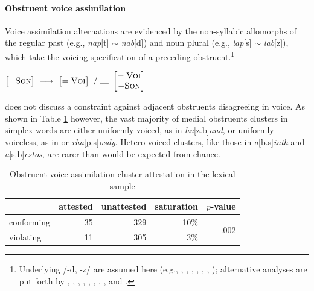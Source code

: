 \paragraph{Obstruent voice assimilation}
\label{ova}

Voice assimilation alternations are evidenced by the non-syllabic allomorphs of the regular past (e.g., \emph{nap}[t] $\sim$ \emph{nab}[d]) and noun plural (e.g., \emph{lap}[s] $\sim$ \emph{lab}[z]), which take the voicing specification of a preceding obstruent.\footnote{Underlying /-d, -z/ are assumed here (e.g., \citealt{Anderson1973a}, \citealt[284f.]{Bakovic2005b}, \citealt{Basboll1972}, \citealt[210]{SPE}, \citealt[282]{Hockett1958}, \citealt[102]{Pinker1988}, \citealt{Shibatani1972}); alternative analyses are put forth by \citet[210f.]{LANGUAGE}, \citet[135]{Borowsky1986}, \citet{Hoard1971}, \citet{Kiparsky1985}, \citet{Lightner1970}, \citet{Luelsdorff1969}, \citet{Miner1975}, \citet[426]{Nida1948}, and \citet{Zwicky1975}.}

\begin{example}
\label{ovarule}
$\begin{bmatrix} -\textsc{Son} \end{bmatrix}~\goesto~\begin{bmatrix} =\textsc{Voi} \end{bmatrix}~/~\gap~\begin{bmatrix} =\textsc{Voi} \\ -\textsc{Son} \end{bmatrix}$
\end{example}

\noindent
\citet{Pierrehumbert1994} does not discuss a constraint against adjacent obstruents disagreeing in voice. 
As shown in Table \ref{ovatab} however, the vast majority of medial obstruents clusters in simplex words are either uniformly voiced, as in \emph{hu}[z.b]\emph{and}, or uniformly voiceless, as in or \emph{rha}[p.s]\emph{osdy}. Hetero-voiced clusters, like those in \emph{a}[b.s]\emph{inth} and \emph{a}[s.b]\emph{estos}, are rarer than would be expected from chance.

\begin{table}
\centering
\begin{tabular}{l rrrr}
\toprule
           & attested & unattested & saturation & $p$-value \\
\midrule
conforming & 35       & 329        & 10\%       & \multirow{2}{*}{.002} \\
violating  & 11       & 305        &  3\%       \\
\bottomrule
\end{tabular}
\caption{Obstruent voice assimilation cluster attestation in the lexical sample}
\label{ovatab}
\end{table}

